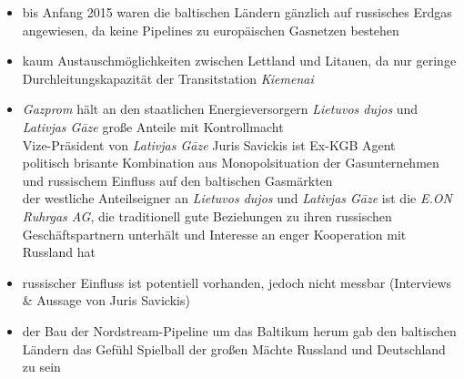 \documentclass[11pt,a4paper]{article}
\begin{document}
\vspace{2cm}

\begin{itemize}


\item bis Anfang 2015 waren die baltischen Ländern gänzlich auf russisches Erdgas angewiesen, da keine Pipelines zu europäischen Gasnetzen bestehen

\item kaum Austauschmöglichkeiten zwischen Lettland und Litauen, da nur geringe Durchleitungskapazität der Transitstation \textsl{Kiemenai}

\item \textsl{Gazprom} hält an den staatlichen Energieversorgern \emph{Lietuvos dujos} und \emph{Lativjas G\={a}ze} große Anteile mit Kontrollmacht\\
 Vize-Präsident von \emph{Lativjas G\={a}ze} Juris Savickis ist Ex-KGB Agent\\
 politisch brisante Kombination aus Monopolsituation der Gasunternehmen und russischem Einfluss auf den baltischen Gasmärkten\\
 der westliche Anteilseigner an \emph{Lietuvos dujos} und \emph{Lativjas G\={a}ze} ist die \emph{E.ON Ruhrgas AG}, die traditionell gute Beziehungen zu ihren russischen Geschäftspartnern unterhält und Interesse an enger Kooperation mit Russland hat

\item russischer Einfluss ist potentiell vorhanden, jedoch nicht messbar (Interviews \& Aussage von Juris Savickis)

\item der Bau der Nordstream-Pipeline um das Baltikum herum gab den baltischen Ländern das Gefühl Spielball der großen Mächte Russland und Deutschland zu sein


\end{itemize}

\subsection*{\color{MidnightBlue}{Gazprom}}
\end{document}
